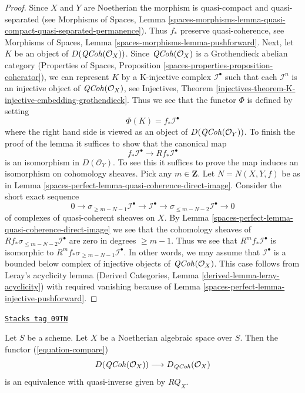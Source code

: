 \begin{proof}
Since $X$ and $Y$ are Noetherian the morphism is quasi-compact
and quasi-separated (see
Morphisms of Spaces, Lemma
\ref{spaces-morphisms-lemma-quasi-compact-quasi-separated-permanence}).
Thus $f_*$ preserve quasi-coherence, see
Morphisms of Spaces, Lemma \ref{spaces-morphisms-lemma-pushforward}.
Next, let $K$ be an object of $D(\mathit{QCoh}(\mathcal{O}_X))$.
Since $\mathit{QCoh}(\mathcal{O}_X)$ is a Grothendieck abelian category
(Properties of Spaces, Proposition
\ref{spaces-properties-proposition-coherator}), we can
represent $K$ by a K-injective complex $\mathcal{I}^\bullet$
such that each $\mathcal{I}^n$ is an injective object of
$\mathit{QCoh}(\mathcal{O}_X)$, see
Injectives, Theorem
\ref{injectives-theorem-K-injective-embedding-grothendieck}.
Thus we see that the functor $\Phi$ is defined by setting
$$
\Phi(K) = f_*\mathcal{I}^\bullet
$$
where the right hand side is viewed as an object of
$D(\mathit{QCoh}(\mathcal{O}_Y))$. To finish the proof of the lemma
it suffices to show that the canonical map
$$
f_*\mathcal{I}^\bullet \longrightarrow Rf_*\mathcal{I}^\bullet
$$
is an isomorphism in $D(\mathcal{O}_Y)$. To see this it suffices to
prove the map induces an isomorphism on cohomology sheaves. Pick any
$m \in \mathbf{Z}$. Let $N = N(X, Y, f)$ be as in
Lemma \ref{spaces-perfect-lemma-quasi-coherence-direct-image}.
Consider the short exact sequence
$$
0 \to \sigma_{\geq m - N - 1}\mathcal{I}^\bullet \to
\mathcal{I}^\bullet \to \sigma_{\leq m - N - 2}\mathcal{I}^\bullet \to 0
$$
of complexes of quasi-coherent sheaves on $X$. By
Lemma \ref{spaces-perfect-lemma-quasi-coherence-direct-image}
we see that the cohomology sheaves of
$Rf_*\sigma_{\leq m - N - 2}\mathcal{I}^\bullet$
are zero in degrees $\geq m - 1$. Thus we see that
$R^mf_*\mathcal{I}^\bullet$ is isomorphic to
$R^mf_*\sigma_{\geq m - N - 1}\mathcal{I}^\bullet$.
In other words, we may assume that $\mathcal{I}^\bullet$
is a bounded below complex of injective objects of
$\mathit{QCoh}(\mathcal{O}_X)$.
This case follows from Leray's acyclicity lemma
(Derived Categories, Lemma \ref{derived-lemma-leray-acyclicity})
with required vanishing because of Lemma \ref{spaces-perfect-lemma-injective-pushforward}.
\end{proof}

\begin{proposition}[Noetherian]
\label{spaces-perfect-proposition-Noetherian}
\href{https://stacks.math.columbia.edu/tag/09TN}{\texttt{Stacks tag 09TN}}

Let $S$ be a scheme. Let $X$ be a Noetherian algebraic space over $S$.
Then the functor (\ref{equation-compare})
$$
D(\mathit{QCoh}(\mathcal{O}_X))
\longrightarrow
D_{\mathit{QCoh}}(\mathcal{O}_X)
$$
is an equivalence with quasi-inverse given by $RQ_X$.
\end{proposition}

